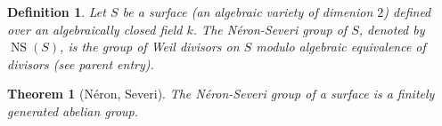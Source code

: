\documentclass[12pt]{article}
\newtheorem*{thm}{Theorem}
\newtheorem{defn}{Definition}
\theoremstyle{definition}
\begin{document}
\begin{defn}
Let $S$ be a surface (an algebraic variety of dimenion $2$) defined over an algebraically closed field $k$. The N\'eron-Severi group of $S$, denoted by $\operatorname{NS}(S)$, is the group of Weil divisors on $S$ modulo algebraic equivalence of divisors (see parent entry).
\end{defn}

\begin{thm}[N\'eron, Severi]
The N\'eron-Severi group of a surface is a finitely generated abelian group.
\end{thm}
\end{document}
